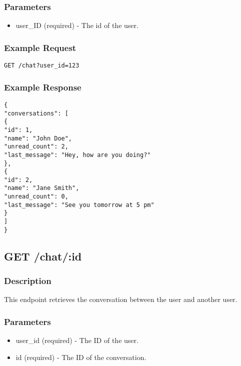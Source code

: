 \documentclass{article}
\begin{document}
\subsubsection{Parameters}

\begin{itemize}
    \item user\_ID (required) - The id of the user.
\end{itemize}

\subsubsection{Example Request}

\begin{verbatim}
GET /chat?user_id=123
\end{verbatim}

\subsubsection{Example Response}

\begin{verbatim}
{
"conversations": [
{
"id": 1,
"name": "John Doe",
"unread_count": 2,
"last_message": "Hey, how are you doing?"
},
{
"id": 2,
"name": "Jane Smith",
"unread_count": 0,
"last_message": "See you tomorrow at 5 pm"
}
]
}
\end{verbatim}

\subsection{GET /chat/:id}

\subsubsection{Description}

This endpoint retrieves the conversation between the user and another user.

\subsubsection{Parameters}

\begin{itemize}
    \item user\_id (required) - The ID of the user.
    \item id (required) - The ID of the conversation.
\end{itemize}
\end{document}
